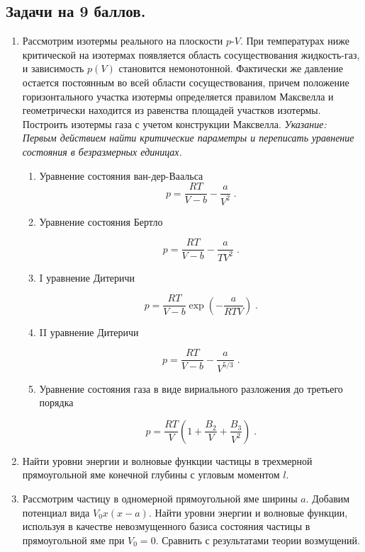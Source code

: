 \documentclass{article}
\newcounter{eee}
\begin{document}
\subsection*{Задачи на 9 баллов.}

\begin{enumerate}
\setcounter{enumi}{\value{eee}}  %


\item Рассмотрим изотермы реального  на плоскости $p$-$V$. При температурах ниже критической на изотермах появляется область сосуществования жидкость-газ, и зависимость $p(V)$ становится немонотонной. Фактически же давление остается постоянным во всей области сосуществования, причем положение горизонтального участка изотермы определяется правилом Максвелла и геометрически находится из равенства площадей участков изотермы. Построить изотермы газа с учетом конструкции Максвелла.
\textit{Указание: Первым действием найти критические параметры и переписать уравнение состояния в безразмерных единицах.}

\begin{enumerate}

\item Уравнение состояния ван-дер-Ваальса
$$
p = \frac{RT}{V - b} - \frac{a}{V^2} \;.
$$

\item Уравнение состояния Бертло

$$
p = \frac{RT}{V - b} - \frac{a}{T V^2} \;.
$$


\item  I уравнение Дитеричи

$$
p = \frac{RT}{V - b}  \exp{\left(-\frac{a}{R T V}\right)} \;.
$$


\item II уравнение Дитеричи

$$
p = \frac{RT}{V - b} - \frac{a}{V^{5/3}} \;.
$$


\item Уравнение состояния газа в виде вириального разложения до третьего порядка

$$
p = \frac{RT}{V} \left( 1 + \frac{B_2}{V} + \frac{B_3}{V^2} \right)\;.
$$


\end{enumerate}


\item Найти уровни энергии и волновые функции частицы в трехмерной прямоугольной яме конечной глубины  с угловым моментом $l$.

\item Рассмотрим частицу в одномерной прямоугольной яме ширины $a$. Добавим потенциал вида $V_0 x (x-a)$. Найти уровни энергии  и волновые функции, используя в качестве невозмущенного базиса состояния частицы в прямоугольной яме при $V_0 = 0$. Сравнить с результатами теории возмущений.



\end{enumerate}
\end{document}
